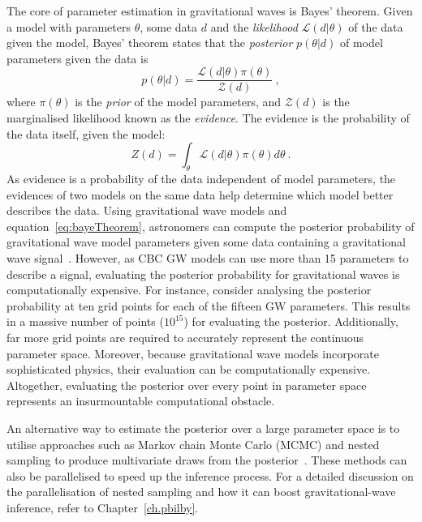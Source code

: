 The core of parameter estimation in gravitational waves is Bayes' theorem. 
Given a model with parameters $\theta$, some data $d$ and the \textit{likelihood} $\mathcal{L}(d|\theta)$ of the data given the model, Bayes' theorem states that the \textit{posterior} $p(\theta|d)$ of model parameters given the data is 
\begin{equation}
{p(\theta|d)} = \frac{\mathcal{L}(d|\theta)\pi(\theta)}{\mathcal{Z}(d)}\ , \label{eq:bayeTheorem}
\end{equation}
where $\pi(\theta)$ is the \textit{prior} of the model parameters, and $\mathcal{Z}(d)$ is the marginalised likelihood known as the
\textit{evidence}. 
The evidence is the probability of the data itself, given the model:
\begin{equation}
Z(d) = \int_\theta \mathcal{L}(d|\theta)\pi(\theta)d\theta\ .
\label{eq:evid}
\end{equation}
As evidence is a probability of the data independent of model parameters, the evidences of two models on the same data help determine which model better describes the data.
Using gravitational wave models and equation~\ref{eq:bayeTheorem}, astronomers can compute the posterior probability of gravitational wave model parameters given some data containing a gravitational wave signal~\cite{abbott2018prospects}.
However, as CBC GW models can use more than 15 parameters to describe a signal, evaluating the posterior probability for gravitational waves is computationally expensive. 
For instance, consider analysing the posterior probability at ten grid points for each of the fifteen GW parameters.
This results in a massive number of points ($10^{15}$) for evaluating the posterior.
Additionally, far more grid points are required to accurately represent the continuous parameter space.
Moreover, because gravitational wave models incorporate sophisticated physics, their evaluation can be computationally expensive.
Altogether, evaluating the posterior over every point in parameter space represents an insurmountable computational obstacle.

An alternative way to estimate the posterior over a large parameter space is to utilise approaches such as Markov chain Monte Carlo (MCMC) and nested sampling to produce multivariate draws from the posterior~\cite{bilby_paper, bilby_gwtc, dynesty_paper, skilling2004, skilling2006}. 
These methods can also be parallelised to speed up the inference process. 
For a detailed discussion on the parallelisation of nested sampling and how it can boost gravitational-wave inference, refer to Chapter~\ref{ch.pbilby}. 


